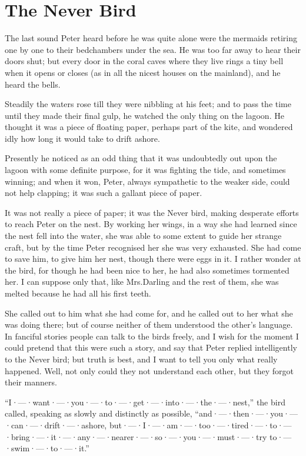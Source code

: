 
\chapter{The Never Bird}

The last sound Peter heard before he was quite alone
were the mermaids retiring one by one to their bedchambers under the sea.
He was too far away to hear their doors shut;
but every door in the coral caves where they live rings a tiny bell when it opens or closes
(as in all the nicest houses on the mainland),
and he heard the bells.

Steadily the waters rose till they were nibbling at his feet;
and to pass the time until they made their final gulp,
he watched the only thing on the lagoon.
He thought it was a piece of floating paper, perhaps part of the kite,
and wondered idly how long it would take to drift ashore.

Presently he noticed as an odd thing that it was undoubtedly out upon the lagoon with some definite purpose,
for it was fighting the tide, and sometimes winning;
and when it won, Peter, always sympathetic to the weaker side, could not help clapping;
it was such a gallant piece of paper.

It was not really a piece of paper;
it was the Never bird, making desperate efforts to reach Peter on the nest.
By working her wings, in a way she had learned since the nest fell into the water,
she was able to some extent to guide her strange craft,
but by the time Peter recognised her she was very exhausted.
She had come to save him, to give him her nest, though there were eggs in it.
I rather wonder at the bird, for though he had been nice to her, he had also sometimes tormented her.
I can suppose only that, like Mrs.\@ Darling and the rest of them, she was melted because he had all his first teeth.

She called out to him what she had come for,
and he called out to her what she was doing there;
but of course neither of them understood the other’s language.
In fanciful stories people can talk to the birds freely,
and I wish for the moment I could pretend that this were such a story,
and say that Peter replied intelligently to the Never bird;
but truth is best, and I want to tell you only what really happened.
Well, not only could they not understand each other, but they forgot their manners.

“I·—·want·—·you·—·to·—·get·—·into·—·the·—·nest,” the bird called,
speaking as slowly and distinctly as possible,
“and·—·then·—·you·—·can·—·drift·—·ashore,
but·—·I·—·am·—·too·—·tired·—·to·—·bring·—·it·—·any·—·nearer·—·so·—·you·—·must·—·try to·—·swim·—·to·—·it.”

